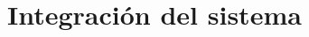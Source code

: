 \documentclass[a4paper,11pt]{memoir}
\begin{document}
%
%
%
%
%
%
%
\chapter{Integración del sistema}

\end{document}
